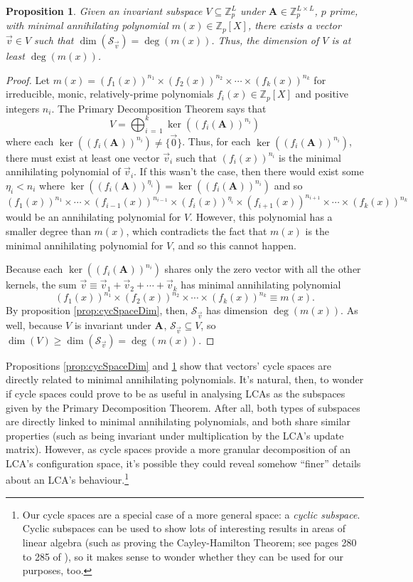 \documentclass[a4paper, 12pt, reqno]{amsart}
\newtheorem{prop}{Proposition}
\newcommand{\Z}{\mathbb{Z}}
\newcommand\Mat[2][]{\mathbf{#1}^{\!#2}}
\newcommand{\cycsp}[1]{\mathcal{S}_{#1}}
\newcommand{\dq}[1]{``#1''}
\begin{document}
	\begin{prop}
		\label{prop:cycSpaceMandatoryCycSpace}
		Given an invariant subspace $V \subseteq \Z_p^L$ under $\Mat[A]{} \in \Z_p^{L \times L}$, $p$ prime, with minimal annihilating polynomial $m(x) \in \Z_p[X]$, there 
		exists a vector $\vec{v} \in V$ such that $\dim(\cycsp{\vec{v}}) = \deg(m(x))$. Thus, the dimension of $V$ is at least $\deg(m(x))$.
	\end{prop}
	\begin{proof}
		Let $m(x) = (f_1(x))^{n_1}\times(f_2(x))^{n_2}\times\cdots\times(f_k(x))^{n_k}$ for irreducible, monic, relatively-prime polynomials $f_i(x) \in \Z_p[X]$ and positive 
		integers $n_i$. The Primary Decomposition Theorem says that
		\[
			V = \bigoplus_{i\,=\,1}^k \ker((f_i(\Mat[A]{}))^{n_i})
		\]
		where each $\ker((f_i(\Mat[A]{}))^{n_i}) \neq \{\vec{0}\}$. Thus, for each $\ker((f_i(\Mat[A]{}))^{n_i})$, there must exist at least one vector $\vec{v}_i$ such that
		$(f_i(x))^{n_i}$ is the minimal annihilating polynomial of $\vec{v}_i$. If this wasn't the case, then there would exist some $\eta_i < n_i$ where 
		$\ker((f_i(\Mat[A]{}))^{\eta_i}) = \ker((f_i(\Mat[A]{}))^{n_i})$ and so 
		\[
			(f_1(x))^{n_1}\times\cdots\times(f_{i-1}(x))^{n_{i-1}}\times(f_i(x))^{\eta_i}\times(f_{i+1}(x))^{n_{i+1}}\times\cdots\times(f_k(x))^{n_k}
		\]
		would be an annihilating polynomial for $V$. However, this polynomial has a smaller degree than $m(x)$, which contradicts the fact that $m(x)$ is the minimal 
		annihilating polynomial for $V$, and so this cannot happen.
		
		Because each $\ker((f_i(\Mat[A]{}))^{n_i})$ shares only the zero vector with all the other kernels, the sum $\vec{v} \equiv \vec{v}_1 + \vec{v}_2 + \cdots + \vec{v}_k$
		has minimal annihilating polynomial 
		\[
			(f_1(x))^{n_1}\times(f_2(x))^{n_2}\times\cdots\times(f_k(x))^{n_k} \equiv m(x).
		\]
		By proposition \ref{prop:cycSpaceDim}, then, $\cycsp{\vec{v}}$ has dimension $\deg(m(x))$. As well, because $V$ is invariant under $\Mat[A]{}$, 
		$\cycsp{\vec{v}} \subseteq V$, so $\dim(V) \geq \dim(\cycsp{\vec{v}}) = \deg(m(x))$.
	\end{proof}
	
	Propositions \ref{prop:cycSpaceDim} and \ref{prop:cycSpaceMandatoryCycSpace} show that vectors' cycle spaces are directly related to minimal annihilating polynomials. 
	It's natural, then, to wonder if cycle spaces could prove to be as useful in analysing LCAs as the subspaces given by the Primary Decomposition Theorem. After all, both 
	types of subspaces are directly linked to minimal annihilating polynomials, and both share similar properties (such as being invariant under multiplication by the LCA's 
	update matrix). However, as cycle spaces provide a more granular decomposition of an LCA's configuration space, it's possible they could reveal somehow \dq{finer} details 
	about an LCA's behaviour.\footnote{Our cycle spaces are a special case of a more general space: a \emph{cyclic subspace}. Cyclic subspaces can be used to show lots of 
	interesting results in areas of linear algebra (such as proving the Cayley-Hamilton Theorem; see pages 280 to 285 of \citet{Friedberg1989}), so it makes sense to wonder 
	whether they can be used for our purposes, too.}
	
\end{document}
